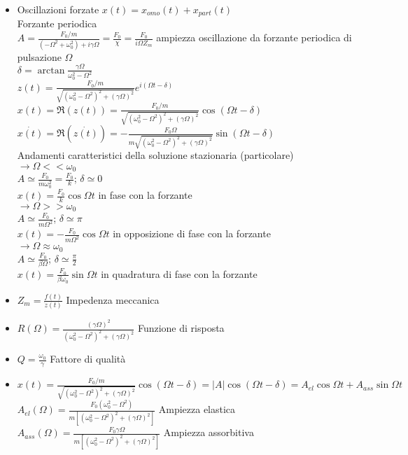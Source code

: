 \documentclass[a4paper]{article}
\begin{document}
\begin{itemize}
		\item Oscillazioni forzate  $x(t)=x_{omo}(t)+x_{part}(t)$\\
		Forzante periodica\\
		$A=\frac{F_0/m}{(-\Omega^2+\omega_0^2)+i\gamma \Omega}=\frac{F_0}{\chi}=\frac{F_0}{i \Omega Z_m}$ ampiezza oscillazione da forzante periodica di pulsazione $\Omega$\\
		$\delta = \arctan\frac{\gamma \Omega}{\omega^2_0-\Omega^2}$\\
		$z(t)=\frac{F_0/m}{\sqrt{(\omega_0^2-\Omega^2)^2+(\gamma \Omega)^2}}e^{i(\Omega t-\delta)}$\\
		$x(t)=\Re(z(t))=\frac{F_0/m}{\sqrt{(\omega_0^2-\Omega^2)^2+(\gamma \Omega)^2}} \cos(\Omega t-\delta)$\\
		$\dot{x(t)}=\Re(\dot{z(t)})=-\frac{F_0 \Omega}{m\sqrt{(\omega_0^2-\Omega^2)^2+(\gamma \Omega)^2}} \sin(\Omega t-\delta)$\\
		Andamenti caratteristici della soluzione stazionaria (particolare)\\
		$\rightarrow \Omega << \omega_0$\\
		$A\simeq \frac{F_0}{m \omega_0^2}= \frac{F_0}{k}$; $\delta \simeq0$\\
		$x(t)=\frac{F_0}{k}\cos\Omega t$ in fase con la forzante\\
		$\rightarrow \Omega >> \omega_0$\\
		$A\simeq \frac{F_0}{m \Omega^2}$; $\delta \simeq \pi$\\
		$x(t)=-\frac{F_0}{m \Omega^2}\cos\Omega t$ in opposizione di fase con la forzante\\
		$\rightarrow \Omega \approx \omega_0$\\
		$A\simeq \frac{F_0}{\beta \Omega}$; $\delta \simeq \frac{\pi}{2}$\\
		$x(t)=\frac{F_0}{\beta \omega_0}\sin\Omega t$ in quadratura di fase con la forzante\\ %
		\item $Z_m=\frac{f(t)}{\dot{z}(t)}$ Impedenza meccanica
		\item $R(\Omega)=\frac{(\gamma \Omega)^2}{(\omega^2_0-\Omega^2)^2+(\gamma \Omega)^2}$ Funzione di risposta
		\item $Q=\frac{\omega_0}{\gamma}$ Fattore di qualità
		\item $x(t)= \frac{F_0/m}{\sqrt{(\omega_0^2 -\Omega^2)^2 + (\gamma \Omega)^2}} \cos(\Omega t-\delta) = |A| \cos(\Omega t -\delta)=A_{el} \cos \Omega t + A_{ass} \sin\Omega t$\\
		$A_{el}(\Omega)=\frac{F_0 (\omega_0^2-\Omega^2)}{m[(\omega_0^2-\Omega^2)^2+(\gamma \Omega)^2]}$ Ampiezza elastica\\
		$A_{ass}(\Omega)=\frac{F_0 \gamma \Omega}{m[(\omega_0^2-\Omega^2)^2+(\gamma \Omega)^2]}$ Ampiezza assorbitiva\\
		
	\end{itemize}
\end{document}

